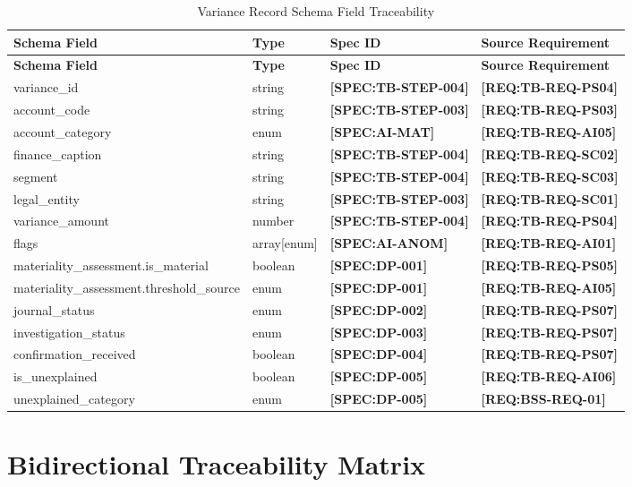 \documentclass[11pt,a4paper]{article}
\newcommand{\reqref}[1]{\textcolor{reqpurple}{\textbf{[REQ:#1]}}}
\newcommand{\specref}[1]{\textcolor{specblue}{\textbf{[SPEC:#1]}}}
\begin{document}
\begin{longtable}{@{}L{4cm}L{3cm}C{2.5cm}L{4cm}@{}}
\caption{Variance Record Schema Field Traceability} \\
\toprule
\textbf{Schema Field} & \textbf{Type} & \textbf{Spec ID} & \textbf{Source Requirement} \\
\midrule
\endfirsthead
\toprule
\textbf{Schema Field} & \textbf{Type} & \textbf{Spec ID} & \textbf{Source Requirement} \\
\midrule
\endhead
variance\_id & string & \specref{TB-STEP-004} & \reqref{TB-REQ-PS04} \\
account\_code & string & \specref{TB-STEP-003} & \reqref{TB-REQ-PS03} \\
account\_category & enum & \specref{AI-MAT} & \reqref{TB-REQ-AI05} \\
finance\_caption & string & \specref{TB-STEP-004} & \reqref{TB-REQ-SC02} \\
segment & string & \specref{TB-STEP-004} & \reqref{TB-REQ-SC03} \\
legal\_entity & string & \specref{TB-STEP-003} & \reqref{TB-REQ-SC01} \\
variance\_amount & number & \specref{TB-STEP-004} & \reqref{TB-REQ-PS04} \\
flags & array[enum] & \specref{AI-ANOM} & \reqref{TB-REQ-AI01} \\
materiality\_assessment.is\_material & boolean & \specref{DP-001} & \reqref{TB-REQ-PS05} \\
materiality\_assessment.threshold\_source & enum & \specref{DP-001} & \reqref{TB-REQ-AI05} \\
journal\_status & enum & \specref{DP-002} & \reqref{TB-REQ-PS07} \\
investigation\_status & enum & \specref{DP-003} & \reqref{TB-REQ-PS07} \\
confirmation\_received & boolean & \specref{DP-004} & \reqref{TB-REQ-PS07} \\
is\_unexplained & boolean & \specref{DP-005} & \reqref{TB-REQ-AI06} \\
unexplained\_category & enum & \specref{DP-005} & \reqref{BSS-REQ-01} \\
\bottomrule
\end{longtable}


\newpage
\section{Bidirectional Traceability Matrix}
\end{document}
